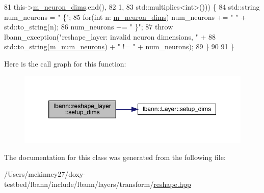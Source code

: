 \begin{DoxyCode}
81                                               this->\hyperlink{classlbann_1_1Layer_abb34bb8031f57a483e2e327a5f229f48}{m\_neuron\_dims}.end(),
82                                               1,
83                                               std::multiplies<int>())) \{
84       std::string num\_neurons = \textcolor{stringliteral}{" \{"};
85       \textcolor{keywordflow}{for}(\textcolor{keywordtype}{int} n: \hyperlink{classlbann_1_1Layer_abb34bb8031f57a483e2e327a5f229f48}{m\_neuron\_dims}) num\_neurons += \textcolor{stringliteral}{" "} + std::to\_string(n);
86       num\_neurons += \textcolor{stringliteral}{" \}"};
87       \textcolor{keywordflow}{throw} lbann\_exception(\textcolor{stringliteral}{"reshape\_layer: invalid neuron dimensions, "} +
88                              std::to\_string(\hyperlink{classlbann_1_1Layer_a6b5ebc8a7d9329d8a773ed787e7b41d8}{m\_num\_neurons}) + \textcolor{stringliteral}{" != "} + num\_neurons);
89     \}
90 
91   \}
\end{DoxyCode}
Here is the call graph for this function\+:\nopagebreak
\begin{figure}[H]
\begin{center}
\leavevmode
\includegraphics[width=350pt]{classlbann_1_1reshape__layer_a60fd29f11e62137a0808ffe4b3730344_cgraph}
\end{center}
\end{figure}


The documentation for this class was generated from the following file\+:\begin{DoxyCompactItemize}
\item 
/\+Users/mckinney27/doxy-\/testbed/lbann/include/lbann/layers/transform/\hyperlink{reshape_8hpp}{reshape.\+hpp}\end{DoxyCompactItemize}
